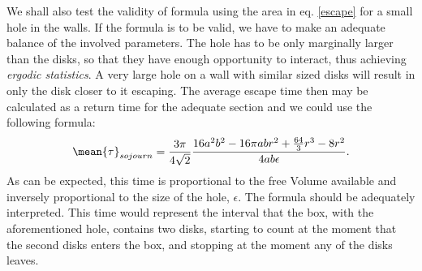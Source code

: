 We shall also test the validity of formula using the area in eq. \ref{escape}
for a small hole in the walls. If the formula is to be valid, we have
to make an adequate balance of the involved parameters. The hole has to
be only marginally larger than the disks, so that they have enough opportunity
to interact, thus achieving \emph{ergodic statistics}. A very large hole
on a wall with similar sized disks will result in only the disk closer to
it escaping. The average escape time then may be calculated as
a return time for the adequate section and we could use the following formula:
\begin{equation} 
\mean{\tau}_{sojourn} = 	
\frac{3 \pi}{4\sqrt{2}}
\frac {16a^2b^2-16\pi a b r^2 + \frac{64}{3} r^3 - 8 r^2  }
{4 a b \epsilon}.
\end{equation}
As can be expected, this time is proportional to the
free Volume available and inversely proportional to the size of the hole, $\epsilon$.
The formula should be adequately interpreted. This time would represent
the interval that the box, with the aforementioned hole, contains two disks,
starting to count at the moment that the second disks enters the box, and
stopping at the moment any of the disks leaves. 

